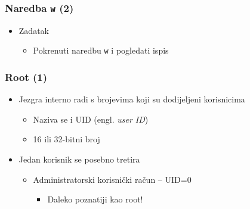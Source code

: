 \documentclass{beamer}
\newcommand{\shell}[1]{\texttt{#1}}
\begin{document}
\begin{frame}[t]
\frametitle{Naredba \shell{w} (2)}
\begin{itemize}
  \item Zadatak
  \begin{itemize}
    \item Pokrenuti naredbu \shell{w} i pogledati ispis
  \end{itemize}
    \begin{table}[h]\footnotesize
    \end{table}
\end{itemize}
\end{frame}

\begin{frame}[t]
\frametitle{Root (1)} 
\begin{itemize}
  \item Jezgra interno radi s brojevima koji su dodijeljeni korisnicima
  \begin{itemize}
    \item Naziva se i UID (engl. \emph{user ID})
    \item 16 ili 32-bitni broj
  \end{itemize}
  \item Jedan korisnik se posebno tretira
  \begin{itemize}
    \item Administratorski korisnički račun -- UID=0
    \begin{itemize}
      \item Daleko poznatiji kao root!
    \end{itemize}
  \end{itemize}
\end{itemize}
\end{frame}
\end{document}
